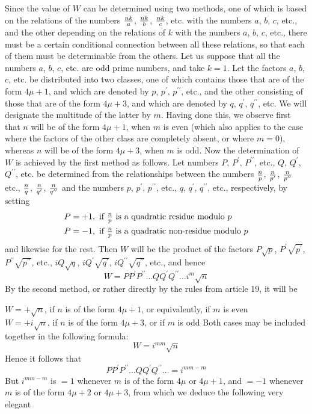 \documentclass[twoside,12pt]{memoir}
\renewenvironment{quote}%
  {\list{}{\leftmargin=5em\rightmargin=0em}\item[]}%
  {\endlist}
\let\oldfrac\frac
\def\frac#1#2{\mathchoice{\tfrac{#1}{#2}}{\oldfrac{#1}{#2}}{\genfrac{}{}{}{2}{#1}{#2\mathstrut}}{\genfrac{}{}{}{3}{#1}{#2\mathstrut}}}
\begin{document}
Since the value of \(W\) can be determined using two methods, one of which is based on the relations of the numbers \(\frac{n k}{a}\), \(\frac{n k}{b}\), \(\frac{n k}{c}\), etc{.} with the numbers \(a\), \(b\), \(c\), etc{.}, and the other depending on the relations of \(k\) with the numbers \(a\), \(b\), \(c\), etc{.}, there must be a certain conditional connection between all these relations, so that each of them must be determinable from the others. Let us suppose that all the numbers \(a\), \(b\), \(c\), etc{.} are odd prime numbers, and take \(k=1\). Let the factors \(a\), \(b\), \(c\), etc{.} be distributed into two classes, one of which contains those that are of the form \(4\mu+1\), and which are denoted by \(p\), \(p^{\prime}\), \(p^{\prime\prime}\), etc{.}, and the other consisting of those that are of the form \(4\mu+3\), and which are denoted by \(q\), \(q^{\prime}\), \(q^{\prime\prime}\), etc{.} We will designate the multitude of the latter by \(m\). Having done this, we observe first that \(n\) will be of the form \(4\mu+1\), when \(m\) is even (which also applies to the case where the factors of the other class are completely absent, or where \(m=0\)), whereas \(n\) will be of the form \(4\mu+3\), when \(m\) is odd. Now the determination of \(W\) is achieved by the first method as follows. Let numbers \(P\), \(P^{\prime}\), \(P^{\prime\prime}\), etc{.}, \(Q\), \(Q^{\prime}\), \(Q^{\prime\prime}\), etc{.} be determined from the relationships between the numbers \(\frac{n}{p}\), \(\frac{n}{p^{\prime}}\), \(\frac{n}{p^{\prime \prime}}\) etc., \(\frac{n}{q}\), \(\frac{n}{q^{\prime}}\), \(\frac{n}{q^{\prime \prime}}\) and the numbers \(p\), \(p^{\prime}\), \(p^{\prime\prime}\), etc{.}, \(q\), \(q^{\prime}\), \(q^{\prime\prime}\), etc{.}, respectively, by setting
\[\begin{aligned}
& P=+1, \text{ if } \frac{n}{p} \text{ is a quadratic residue modulo } p \\
& P=-1, \text{ if } \frac{n}{p} \text{ is a quadratic non-residue modulo } p
\end{aligned}\]
and likewise for the rest. Then \(W\) will be the product of the factors \(P \sqrt{p}\), \(P^{\prime} \sqrt{p^{\prime}}\), \(P^{\prime\prime} \sqrt{p^{\prime\prime}}\), etc{.}, \(iQ \sqrt{q}\), \(iQ^{\prime} \sqrt{q^{\prime}}\), \(iQ^{\prime\prime} \sqrt{q^{\prime\prime}}\), etc{.}, and hence
\[W=P P^{\prime} P^{\prime\prime} \ldots Q Q^{\prime} Q^{\prime\prime} \ldots i^{m} \sqrt{n}\]
By the second method, or rather directly by the rules from article 19, it will be
\begin{quote}\(W=+\surd{n}\), if \(n\) is of the form \(4\mu+1\), or equivalently, if \(m\) is even\\
\(W=+i \surd{n}\), if \(n\) is of the form \(4\mu+3\), or if \(m\) is odd\end{quote}
Both cases may be included together in the following formula:
\[W=i^{m m} \surd{n}\]
Hence it follows that
\[P P^{\prime} P^{\prime\prime} \ldots Q Q^{\prime} Q^{\prime\prime} \ldots=i^{m m-m}\]
But \(i^{m m-m}\) is \(=1\) whenever \(m\) is of the form \(4\mu\) or \(4\mu+1\), and \(=-1\) whenever \(m\) is of the form \(4\mu+2\) or \(4\mu+3\), from which we deduce the following very elegant
%
\end{document}
